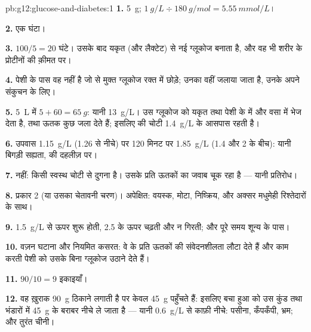 \begin{solution}{pb:g12:glucose-and-diabetes:1}
\textbf{1.} \qty{5}{g}; $\qty{1}{g/L} \div \qty{180}{g/mol} = \qty{5.55}{mmol/L}$।

\textbf{2.} एक घंटा।

\textbf{3.} $100/5 = 20$ घंटे। उसके बाद यकृत  (और लैक्टेट) से
नई ग्लूकोज बनाता है, और वह भी शरीर के प्रोटीनों की क़ीमत पर।

\textbf{4.} पेशी  के पास वह  नहीं है जो  से मुक्त
ग्लूकोज रक्त में छोड़े; उनका  वहीं जलाया जाता है, उनके अपने संकुचन
के लिए।

\textbf{5.} \qty{5}{L} में $5 + 60 = \qty{65}{g}$: यानी \qty{13}{g/L}।
 उस ग्लूकोज को यकृत तथा पेशी के  में और वसा में भेज देता है,
तथा ऊतक कुछ जला देते हैं; इसलिए  की चोटी \qty{1.4}{g/L} के
आसपास रहती है।

\textbf{6.} उपवास \qty{1.15}{g/L} (1.26 से नीचे) पर 120 मिनट पर
\qty{1.85}{g/L} (1.4 और 2 के बीच): यानी बिगड़ी सह्यता,  की दहलीज़ पर।

\textbf{7.} नहीं:  किसी स्वस्थ चोटी से दुगना है। उसके प्रति ऊतकों का
जवाब चूक रहा है --- यानी  प्रतिरोध।

\textbf{8.} प्रकार 2 (या उसका चेतावनी चरण)। अपेक्षित: वयस्क, मोटा,
निष्क्रिय, और अक्सर मधुमेही रिश्तेदारों के साथ।

\textbf{9.}  \qty{1.5}{g/L} से ऊपर शुरू होती, \num{2.5} के ऊपर
चढ़ती और न गिरती; और  पूरे समय शून्य के पास।

\textbf{10.} वज़न घटाना और नियमित कसरत: वे  के प्रति ऊतकों की
संवेदनशीलता लौटा देते हैं और काम करती पेशी को उसके बिना ग्लूकोज उठाने देते
हैं।

\textbf{11.} $90/10 = 9$ इकाइयाँ।

\textbf{12.} वह ख़ुराक \qty{90}{g} ठिकाने लगाती है पर केवल \qty{45}{g}
पहुँचते हैं: इसलिए बचा हुआ   को उस कुंड तथा भंडारों में
\qty{45}{g} के बराबर नीचे ले जाता है --- यानी \qty{0.6}{g/L} से काफ़ी
नीचे: पसीना, कँपकँपी, भ्रम; और तुरंत चीनी।


\end{solution}
